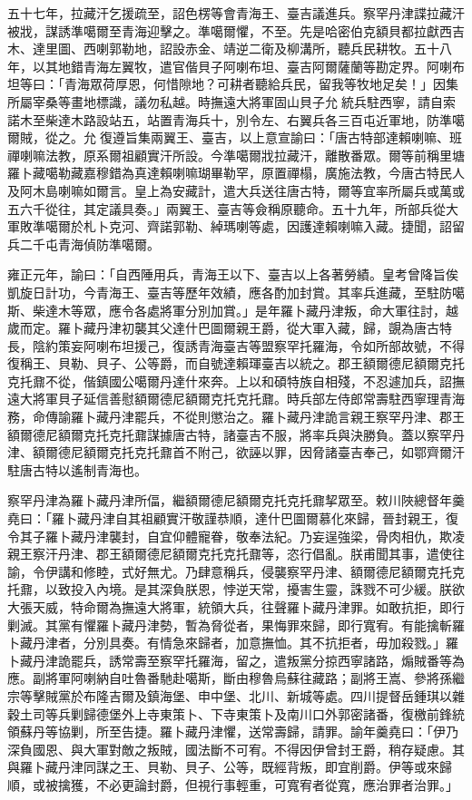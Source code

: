 \begin{pinyinscope}
五十七年，拉藏汗乞援疏至，詔色楞等會青海王、臺吉議進兵。察罕丹津諜拉藏汗被戕，謀誘準噶爾至青海迎擊之。準噶爾懼，不至。先是哈密伯克額貝都拉獻西吉木、達里圖、西喇郭勒地，詔設赤金、靖逆二衛及柳溝所，聽兵民耕牧。五十八年，以其地錯青海左翼牧，遣官偕貝子阿喇布坦、臺吉阿爾薩蘭等勘定界。阿喇布坦等曰：「青海眾荷厚恩，何惜隙地？可耕者聽給兵民，留我等牧地足矣！」因集所屬宰桑等畫地標識，議勿私越。時撫遠大將軍固山貝子允統兵駐西寧，請自索諾木至柴達木路設站五，站置青海兵十，別令左、右翼兵各三百屯近軍地，防準噶爾賊，從之。允復遵旨集兩翼王、臺吉，以上意宣諭曰：「唐古特部達賴喇嘛、班禪喇嘛法教，原系爾祖顧實汗所設。今準噶爾戕拉藏汗，離散番眾。爾等前稱里塘羅卜藏噶勒藏嘉穆錯為真達賴喇嘛瑚畢勒罕，原置禪榻，廣施法教，今唐古特民人及阿木島喇嘛如爾言。皇上為安藏計，遣大兵送往唐古特，爾等宜率所屬兵或萬或五六千從往，其定議具奏。」兩翼王、臺吉等僉稱原聽命。五十九年，所部兵從大軍敗準噶爾於札卜克河、齊諾郭勒、綽瑪喇等處，因護達賴喇嘛入藏。捷聞，詔留兵二千屯青海偵防準噶爾。

雍正元年，諭曰：「自西陲用兵，青海王以下、臺吉以上各著勞績。皇考曾降旨俟凱旋日計功，今青海王、臺吉等歷年效績，應各酌加封賞。其率兵進藏，至駐防噶斯、柴達木等眾，應令各處將軍分別加賞。」是年羅卜藏丹津叛，命大軍往討，越歲而定。羅卜藏丹津初襲其父達什巴圖爾親王爵，從大軍入藏，歸，覬為唐古特長，陰約策妄阿喇布坦援己，復誘青海臺吉等盟察罕托羅海，令如所部故號，不得復稱王、貝勒、貝子、公等爵，而自號達賴琿臺吉以統之。郡王額爾德尼額爾克托克托鼐不從，偕鎮國公噶爾丹達什來奔。上以和碩特族自相殘，不忍遽加兵，詔撫遠大將軍貝子延信善慰額爾德尼額爾克托克托鼐。時兵部左侍郎常壽駐西寧理青海務，命傳諭羅卜藏丹津罷兵，不從則懲治之。羅卜藏丹津詭言親王察罕丹津、郡王額爾德尼額爾克托克托鼐謀據唐古特，諸臺吉不服，將率兵與決勝負。蓋以察罕丹津、額爾德尼額爾克托克托鼐首不附己，欲誣以罪，因脅諸臺吉奉己，如鄂齊爾汗駐唐古特以遙制青海也。

察罕丹津為羅卜藏丹津所偪，繼額爾德尼額爾克托克托鼐挈眾至。敕川陜總督年羹堯曰：「羅卜藏丹津自其祖顧實汗敬謹恭順，達什巴圖爾慕化來歸，晉封親王，復令其子羅卜藏丹津襲封，自宜仰體寵眷，敬奉法紀。乃妄逞強梁，骨肉相仇，欺凌親王察汗丹津、郡王額爾德尼額爾克托克托鼐等，恣行倡亂。朕甫聞其事，遣使往諭，令伊講和修睦，式好無尤。乃肆意稱兵，侵襲察罕丹津、額爾德尼額爾克托克托鼐，以致投入內境。是其深負朕恩，悖逆天常，擾害生靈，誅戮不可少緩。朕欲大張天威，特命爾為撫遠大將軍，統領大兵，往聲羅卜藏丹津罪。如敢抗拒，即行剿滅。其黨有懼羅卜藏丹津勢，暫為脅從者，果悔罪來歸，即行寬宥。有能擒斬羅卜藏丹津者，分別具奏。有情急來歸者，加意撫恤。其不抗拒者，毋加殺戮。」羅卜藏丹津詭罷兵，誘常壽至察罕托羅海，留之，遣叛黨分掠西寧諸路，煽賊番等為應。副將軍阿喇納自吐魯番馳赴噶斯，斷由穆魯烏蘇往藏路；副將王嵩、參將孫繼宗等擊賊黨於布隆吉爾及鎮海堡、申中堡、北川、新城等處。四川提督岳鍾琪以雜穀土司等兵剿歸德堡外上寺東策卜、下寺東策卜及南川口外郭密諸番，復檄前鋒統領蘇丹等協剿，所至告捷。羅卜藏丹津懼，送常壽歸，請罪。諭年羹堯曰：「伊乃深負國恩、與大軍對敵之叛賊，國法斷不可宥。不得因伊曾封王爵，稍存疑慮。其與羅卜藏丹津同謀之王、貝勒、貝子、公等，既經背叛，即宜削爵。伊等或來歸順，或被擒獲，不必更論封爵，但視行事輕重，可寬宥者從寬，應治罪者治罪。」


\end{pinyinscope}
